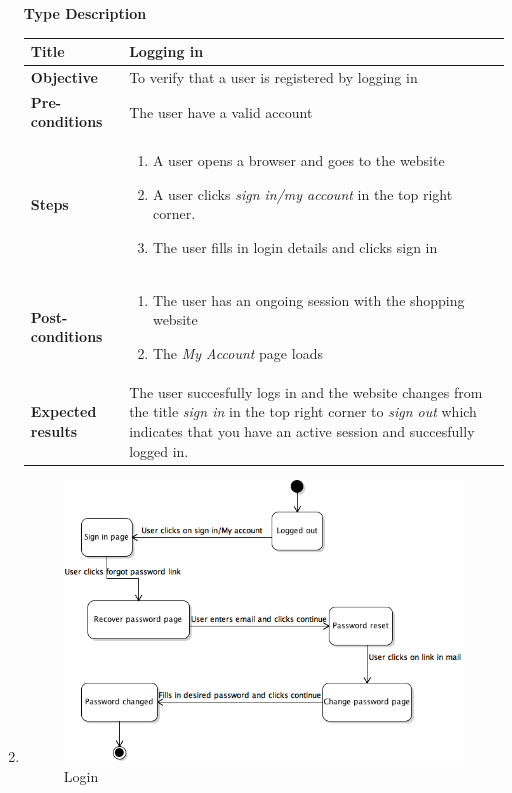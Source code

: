 \documentclass[UKenglish,12pt]{article}
\begin{document}
\begin{enumerate}
\textbf{\hspace{0.3cm}Type\hspace{4.4cm} Description}
\newline \vspace{0.2cm}
\begin{tabular}{| p{5cm} | p{10cm} | }
	\hline
	 \textbf{Title} & Logging in\\ \hline
	 \textbf{Objective} & To verify that a user is registered by logging in\\ \hline
	 \textbf{Pre-conditions} & The user have a valid account\\ \hline
	 \textbf{Steps} & \begin{enumerate} \item A user opens a browser and goes to the website \item A user clicks \textit{sign in/my account} in the top right corner. \item The user fills in login details and clicks sign in \end{enumerate} \\ \hline
	 \textbf{Post-conditions} & \begin{enumerate} \item The user has an ongoing session with the shopping website \item The \textit{My Account} page loads \end{enumerate} \\ \hline
	 \textbf{Expected results} &  The user succesfully logs in and the website changes from the title \textit{sign in} in the top right corner to \textit{sign out} which indicates that you have an active session and succesfully logged in.\\ 
	 \hline
\end{tabular} %


\item
\begin{figure}[!h]
\centering
\includegraphics[scale=0.7,keepaspectratio]{Images/ResetPassword.png}
\caption{Login}
\end{figure}


\end{enumerate}
\end{document}
